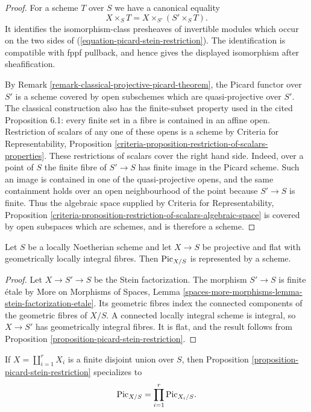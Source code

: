 \begin{proof}
For a scheme $T$ over $S$ we have a canonical equality
$$
X \times_S T = X \times_{S'}(S' \times_S T).
$$
It identifies the isomorphism-class presheaves of invertible modules which
occur on the two sides of
(\ref{equation-picard-stein-restriction}). The identification is compatible
with fppf pullback, and hence gives the displayed isomorphism after
sheafification.

By Remark \ref{remark-classical-projective-picard-theorem}, the Picard
functor over $S'$ is a scheme covered by open subschemes which are
quasi-projective over $S'$. The classical construction also has the
finite-subset property used in the cited Proposition 6.1: every finite set
in a fibre is contained in an affine open. Restriction of scalars of any one
of these opens is a scheme by Criteria for Representability, Proposition
\ref{criteria-proposition-restriction-of-scalars-properties}.
These restrictions of scalars cover the right hand side. Indeed, over a
point of $S$ the finite fibre of $S' \to S$ has finite image in the Picard
scheme. Such an image is contained in one of the quasi-projective opens,
and the same containment holds over an open neighbourhood of the point
because $S' \to S$ is finite. Thus the algebraic space supplied by Criteria
for Representability, Proposition
\ref{criteria-proposition-restriction-of-scalars-algebraic-space} is covered
by open subspaces which are schemes, and is therefore a scheme.
\end{proof}

\begin{lemma}
\label{corollary-picard-geometrically-locally-integral}
Let $S$ be a locally Noetherian scheme and let $X \to S$ be projective and
flat with geometrically locally integral fibres. Then
$\mathrm{Pic}_{X/S}$ is represented by a scheme.
\end{lemma}

\begin{proof}
Let $X \to S' \to S$ be the Stein factorization. The morphism $S' \to S$
is finite \'etale by More on Morphisms of Spaces, Lemma
\ref{spaces-more-morphisms-lemma-stein-factorization-etale}. Its geometric
fibres index the connected components of the geometric fibres of $X/S$.
A connected locally integral scheme is integral, so $X \to S'$ has
geometrically integral fibres. It is flat, and the result follows from
Proposition \ref{proposition-picard-stein-restriction}.
\end{proof}

\begin{example}
\label{example-picard-disjoint-union}
If $X = \coprod_{i = 1}^r X_i$ is a finite disjoint union over $S$, then
Proposition \ref{proposition-picard-stein-restriction} specializes to
$$
\mathrm{Pic}_{X/S} = \prod_{i = 1}^r \mathrm{Pic}_{X_i/S}.
$$
\end{example}

